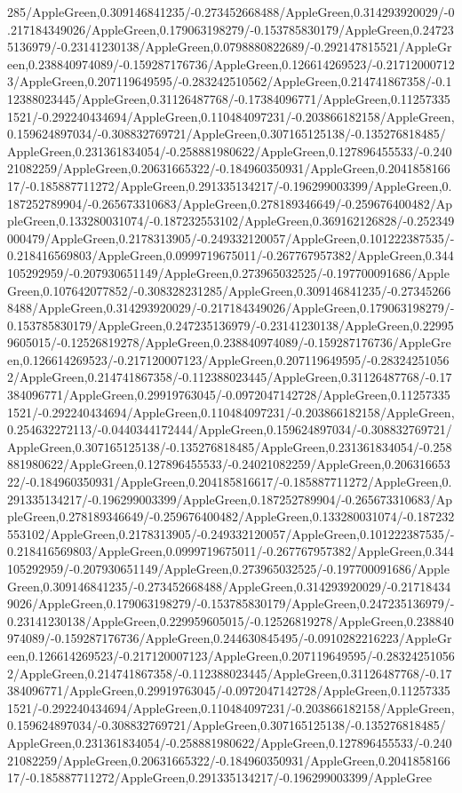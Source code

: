 {\begin{tikzternal}
{285/AppleGreen,0.309146841235/-0.273452668488/AppleGreen,0.314293920029/-0.217184349026/AppleGreen,0.179063198279/-0.153785830179/AppleGreen,0.247235136979/-0.23141230138/AppleGreen,0.0798880822689/-0.292147815521/AppleGreen,0.238840974089/-0.159287176736/AppleGreen,0.126614269523/-0.217120007123/AppleGreen,0.207119649595/-0.283242510562/AppleGreen,0.214741867358/-0.112388023445/AppleGreen,0.31126487768/-0.17384096771/AppleGreen,0.112573351521/-0.292240434694/AppleGreen,0.110484097231/-0.203866182158/AppleGreen,0.159624897034/-0.308832769721/AppleGreen,0.307165125138/-0.135276818485/AppleGreen,0.231361834054/-0.258881980622/AppleGreen,0.127896455533/-0.24021082259/AppleGreen,0.20631665322/-0.184960350931/AppleGreen,0.204185816617/-0.185887711272/AppleGreen,0.291335134217/-0.196299003399/AppleGreen,0.187252789904/-0.265673310683/AppleGreen,0.278189346649/-0.259676400482/AppleGreen,0.133280031074/-0.187232553102/AppleGreen,0.369162126828/-0.252349000479/AppleGreen,0.2178313905/-0.249332120057/AppleGreen,0.101222387535/-0.218416569803/AppleGreen,0.0999719675011/-0.267767957382/AppleGreen,0.344105292959/-0.207930651149/AppleGreen,0.273965032525/-0.197700091686/AppleGreen,0.107642077852/-0.308328231285/AppleGreen,0.309146841235/-0.273452668488/AppleGreen,0.314293920029/-0.217184349026/AppleGreen,0.179063198279/-0.153785830179/AppleGreen,0.247235136979/-0.23141230138/AppleGreen,0.229959605015/-0.12526819278/AppleGreen,0.238840974089/-0.159287176736/AppleGreen,0.126614269523/-0.217120007123/AppleGreen,0.207119649595/-0.283242510562/AppleGreen,0.214741867358/-0.112388023445/AppleGreen,0.31126487768/-0.17384096771/AppleGreen,0.29919763045/-0.0972047142728/AppleGreen,0.112573351521/-0.292240434694/AppleGreen,0.110484097231/-0.203866182158/AppleGreen,0.254632272113/-0.0440344172444/AppleGreen,0.159624897034/-0.308832769721/AppleGreen,0.307165125138/-0.135276818485/AppleGreen,0.231361834054/-0.258881980622/AppleGreen,0.127896455533/-0.24021082259/AppleGreen,0.20631665322/-0.184960350931/AppleGreen,0.204185816617/-0.185887711272/AppleGreen,0.291335134217/-0.196299003399/AppleGreen,0.187252789904/-0.265673310683/AppleGreen,0.278189346649/-0.259676400482/AppleGreen,0.133280031074/-0.187232553102/AppleGreen,0.2178313905/-0.249332120057/AppleGreen,0.101222387535/-0.218416569803/AppleGreen,0.0999719675011/-0.267767957382/AppleGreen,0.344105292959/-0.207930651149/AppleGreen,0.273965032525/-0.197700091686/AppleGreen,0.309146841235/-0.273452668488/AppleGreen,0.314293920029/-0.217184349026/AppleGreen,0.179063198279/-0.153785830179/AppleGreen,0.247235136979/-0.23141230138/AppleGreen,0.229959605015/-0.12526819278/AppleGreen,0.238840974089/-0.159287176736/AppleGreen,0.244630845495/-0.0910282216223/AppleGreen,0.126614269523/-0.217120007123/AppleGreen,0.207119649595/-0.283242510562/AppleGreen,0.214741867358/-0.112388023445/AppleGreen,0.31126487768/-0.17384096771/AppleGreen,0.29919763045/-0.0972047142728/AppleGreen,0.112573351521/-0.292240434694/AppleGreen,0.110484097231/-0.203866182158/AppleGreen,0.159624897034/-0.308832769721/AppleGreen,0.307165125138/-0.135276818485/AppleGreen,0.231361834054/-0.258881980622/AppleGreen,0.127896455533/-0.24021082259/AppleGreen,0.20631665322/-0.184960350931/AppleGreen,0.204185816617/-0.185887711272/AppleGreen,0.291335134217/-0.196299003399/AppleGree}
\end{tikzternal}}
